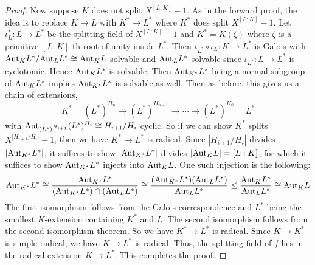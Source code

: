 \documentclass[../book.tex]{subfiles}
\begin{document}
\begin{proof}
    Now suppose $K$ does not split $X^{[L : K]} - 1$. 
    As in the forward proof, 
    the idea is to replace $K \to L$ with 
    $K^* \to L^*$ where $K^*$ does split $X^{[L : K]} - 1$.
    Let $\iota_L^* : L \to L^*$ be the splitting field of $X^{[L : K]} - 1$
    and $K^* = K(\zeta)$ where 
    $\zeta$ is a primitive $[L : K]$-th root of unity inside $L^*$.
    Then $\iota_{L^*} \circ \iota_L : K \to L^*$ is Galois 
    with $\mathrm{Aut}_{K}L^* / \mathrm{Aut}_{L}L^* \cong \mathrm{Aut}_{K}L$ solvable
    and $\mathrm{Aut}_{L}L^*$ solvable since $\iota_{L^*} : L \to L^*$ is cyclotomic. 
    Hence $\mathrm{Aut}_{K}L^*$ is solvable.
    Then $\mathrm{Aut}_{K^*}L^*$ being a normal subgroup of $\mathrm{Aut}_{K}L^*$
    implies $\mathrm{Aut}_{K^*}L^*$ is solvable as well.
    Then as before, this gives us a chain of extensions, \[
        K^* = (L^*)^{H_n} \to (L^*)^{H_{n-1}} \to \cdots \to (L^*)^{H_0} = L^*
    \]
    with $\mathrm{Aut}_{(L^*)^{H_{i+1}}}(L^*)^{H_i} \cong H_{i+1} / H_i$ cyclic.
    So if we can show $K^*$ splits $X^{|H_{i+1}/H_i|} - 1$,
    then we have $K^* \to L^*$ is radical.
    Since $|H_{i+1} / H_i|$ divides $|\mathrm{Aut}_{K^*}L^*|$,
    it suffices to show $|\mathrm{Aut}_{K^*}L^*|$ divides $|\mathrm{Aut}_{K}L| = [L : K]$,
    for which it suffices to show $\mathrm{Aut}_{K^*}L^*$ injects into $\mathrm{Aut}_{K}L$.
    One such injection is the following: \[
        \mathrm{Aut}_{K^*}L^* \cong 
        \frac{\mathrm{Aut}_{K^*}L^*}{(\mathrm{Aut}_{K^*}L^*)\cap(\mathrm{Aut}_{L}L^*)}
        \cong \frac{(\mathrm{Aut}_{K^*}L^*)(\mathrm{Aut}_{L}L^*)}{\mathrm{Aut}_{L}L^*}
        \leq \frac{\mathrm{Aut}_{K}L^*}{\mathrm{Aut}_{L}L^*} \cong \mathrm{Aut}_{K}L
    \]
    The first isomorphism follows from 
    the Galois correspondence and
    $L^*$ being the smallest $K$-extension containing $K^*$ and $L$.
    The second isomorphism follows from the second isomorphism theorem.
    So we have $K^* \to L^*$ is radical.
    Since $K \to K^*$ is simple radical, 
    we have $K \to L^*$ is radical.
    Thus, the splitting field of $f$ lies in the radical extension $K \to L^*$.
    This completes the proof. 
    
\end{proof}
\end{document}

